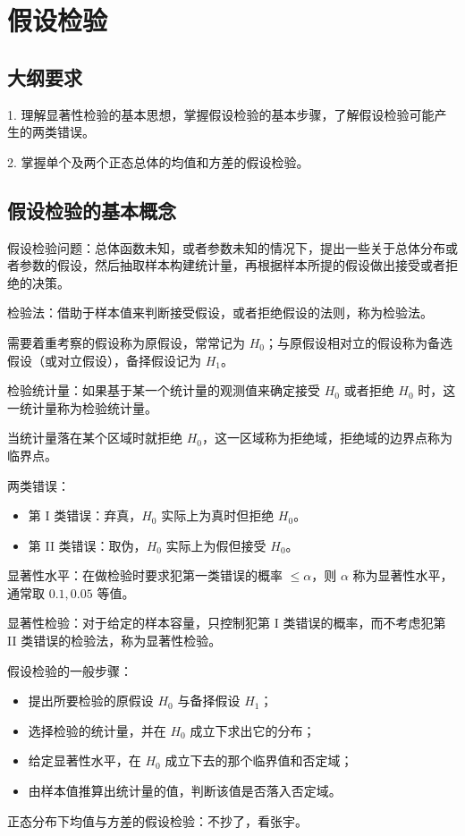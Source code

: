 \section{假设检验}

\subsection{大纲要求}

1. 理解显著性检验的基本思想，掌握假设检验的基本步骤，了解假设检验可能产生的两类错误。

2. 掌握单个及两个正态总体的均值和方差的假设检验。

\subsection{假设检验的基本概念}

假设检验问题：总体函数未知，或者参数未知的情况下，提出一些关于总体分布或者参数的假设，然后抽取样本构建统计量，再根据样本所提的假设做出接受或者拒绝的决策。

检验法：借助于样本值来判断接受假设，或者拒绝假设的法则，称为检验法。

需要着重考察的假设称为原假设，常常记为 $H_0$；与原假设相对立的假设称为备选假设（或对立假设），备择假设记为 $H_1$。

检验统计量：如果基于某一个统计量的观测值来确定接受 $H_0$ 或者拒绝 $H_0$ 时，这一统计量称为检验统计量。

当统计量落在某个区域时就拒绝 $H_0$，这一区域称为拒绝域，拒绝域的边界点称为临界点。

两类错误：
\begin{itemize}
	\item 第 I 类错误：弃真，$H_0$ 实际上为真时但拒绝 $H_0$。
	\item 第 II 类错误：取伪，$H_0$ 实际上为假但接受 $H_0$。
\end{itemize}

显著性水平：在做检验时要求犯第一类错误的概率 $\leqslant \alpha$，则 $\alpha$ 称为显著性水平，通常取 $0.1, 0.05$ 等值。

显著性检验：对于给定的样本容量，只控制犯第 I 类错误的概率，而不考虑犯第 II 类错误的检验法，称为显著性检验。

假设检验的一般步骤：
\begin{itemize}
	\item 提出所要检验的原假设 $H_0$ 与备择假设 $H_1$；
	\item 选择检验的统计量，并在 $H_0$ 成立下求出它的分布；
	\item 给定显著性水平，在 $H_0$ 成立下去的那个临界值和否定域；
	\item 由样本值推算出统计量的值，判断该值是否落入否定域。
\end{itemize}

正态分布下均值与方差的假设检验：不抄了，看张宇。
